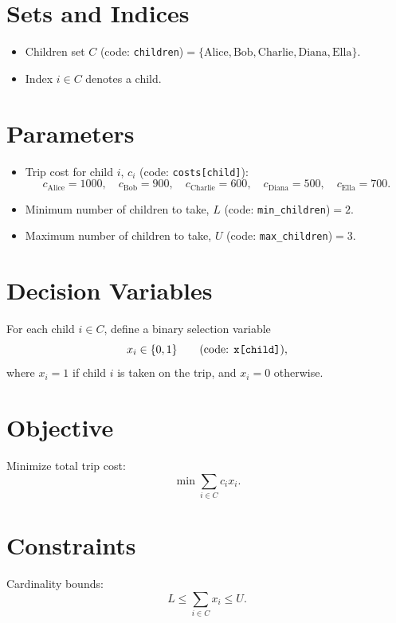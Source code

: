 \section*{Sets and Indices}

\begin{itemize}
    \item Children set $C$ (code: \texttt{children})$=\{\text{Alice},\text{Bob},\text{Charlie},\text{Diana},\text{Ella}\}$.
    \item Index $i \in C$ denotes a child.
\end{itemize}

\section*{Parameters}

\begin{itemize}
    \item Trip cost for child $i$, $c_i$ (code: \texttt{costs[child]}):
    \[
    c_{\text{Alice}}=1000,\quad
    c_{\text{Bob}}=900,\quad
    c_{\text{Charlie}}=600,\quad
    c_{\text{Diana}}=500,\quad
    c_{\text{Ella}}=700.
    \]
    \item Minimum number of children to take, $L$ (code: \texttt{min\_children})$=2$.
    \item Maximum number of children to take, $U$ (code: \texttt{max\_children})$=3$.
\end{itemize}

\section*{Decision Variables}

For each child $i \in C$, define a binary selection variable
\[
x_i \in \{0,1\} \qquad \text{(code: \texttt{x[child]})},
\]
where $x_i=1$ if child $i$ is taken on the trip, and $x_i=0$ otherwise.

\section*{Objective}

Minimize total trip cost:
\[
\min \sum_{i \in C} c_i x_i .
\]

\section*{Constraints}

Cardinality bounds:
\[
L \le \sum_{i \in C} x_i \le U.
\]

